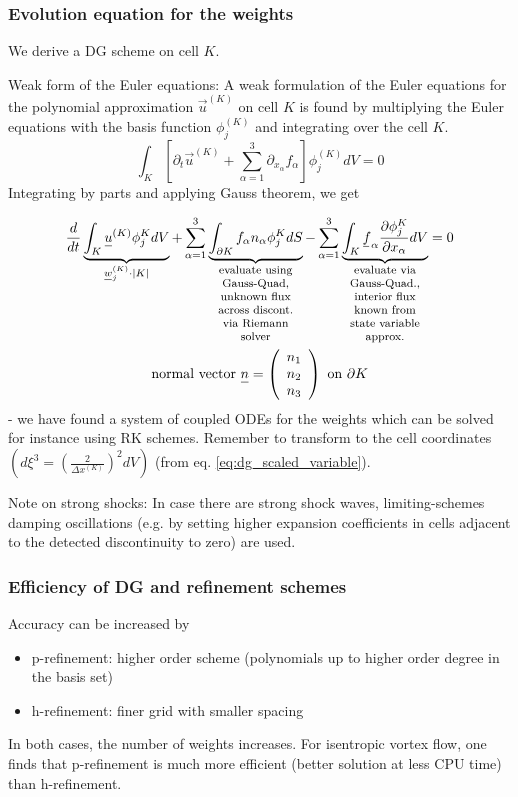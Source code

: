 \subsubsection{Evolution equation for the weights}

We derive a DG scheme on cell $K$.

\textcolor{blue1}{Weak form of the Euler equations}: A weak formulation of the Euler equations
for the polynomial approximation $\vec{u}^{(K)}$ on cell $K$ is found by multiplying the Euler equations
with the basis function $\phi_j^{(K)}$ and integrating over the cell $K$.
\begin{equation}
    \int_K\left[\partial_t \vec{u}^{(K)}+\sum_{\alpha=1}^3 \partial_{x_\alpha} f_\alpha\right] \phi_j^{(K)} d V=0
\end{equation}
Integrating by parts and applying Gauss theorem, we get
\begin{mdframed}
\begin{equation}
    \begin{gathered}
        \frac{d}{d t} \underbrace{\int_K \vec{u}^{(K)} \phi_j^K d V}_{\vec{w}_j^{(K)} \cdot |K|} + \sum_{\alpha=1}^3 \explain{\int_{\partial K} f_\alpha n_\alpha \phi_j^K d S}{evaluate using Gauss-Quad, unknown flux across discont. via Riemann solver} - \sum_{\alpha=1}^3 \explain{\int_K \vec{f}_\alpha \frac{\partial \phi_j^K}{\partial x_\alpha} d V}{evaluate via Gauss-Quad., interior flux known from state variable approx.} = 0 \\
        \text{normal vector } \vec{n} = \left( \begin{array}{c} n_1 \\ n_2 \\ n_3 \end{array} \right) \text{ on } \partial K
    \end{gathered}
\end{equation}
- we have found a system of coupled ODEs for the weights which can be solved for instance using RK schemes.
Remember to transform to the cell coordinates \\ $\left( d\xi^3 = \left( \frac{2}{\Delta x^{(K)}} \right)^2 dV \right)$
(from eq. \ref{eq:dg_scaled_variable}).
\end{mdframed}

Note on strong shocks: In case there are strong shock waves, limiting-schemes damping oscillations (e.g. by setting higher expansion
coefficients in cells adjacent to the detected discontinuity to zero) are used.

\subsubsection{Efficiency of DG and refinement schemes}
Accuracy can be increased by
\begin{itemize}
    \item \textcolor{green1}{p}-refinement: higher order scheme (polynomials up to higher order degree in the basis set)
    \item h-refinement: finer grid with smaller spacing
\end{itemize}

In both cases, the number of weights increases. For isentropic vortex flow, one finds that p-refinement is much
more efficient (better solution at less CPU time) than h-refinement.


\pagebreak